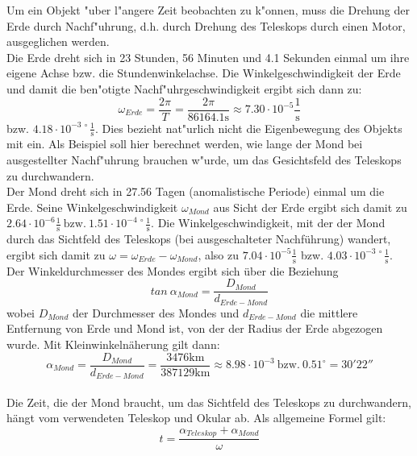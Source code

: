 Um ein Objekt "uber l"angere Zeit beobachten zu k"onnen, muss die Drehung der Erde durch Nachf"uhrung, d.h. durch Drehung des Teleskops durch einen Motor, ausgeglichen werden.
\\
Die Erde dreht sich in 23 Stunden, 56 Minuten und 4.1 Sekunden einmal um ihre eigene Achse bzw. die Stundenwinkelachse.
Die Winkelgeschwindigkeit der Erde und damit die ben"otigte Nachf"uhrgeschwindigkeit ergibt sich dann zu:
\begin{equation}
\omega_{Erde} = \frac{2\pi}{T} = \frac{2\pi}{86164.1 \mathrm{s}} \approx 7.30 \cdot 10^{-5} \frac{1}{\mathrm{s}}
\end{equation}
bzw. $4.18 \cdot 10^{-3\   \circ} \frac{1}{\mathrm{s}}$.
Dies bezieht nat"urlich nicht die Eigenbewegung des Objekts mit ein. Als Beispiel soll hier berechnet werden, wie lange der Mond bei ausgestellter Nachf"uhrung brauchen w"urde, um das Gesichtsfeld des Teleskops zu durchwandern.
\\
Der Mond dreht sich in 27.56 Tagen (anomalistische Periode) einmal um die Erde. Seine Winkelgeschwindigkeit $\omega_{Mond}$ aus Sicht der Erde ergibt sich damit zu $2.64\cdot 10^{-6} \frac{1}{\mathrm{s}}\ \textrm{bzw.}\ 1.51 \cdot 10^{-4\   \circ} \frac{1}{\mathrm{s}}$.
Die Winkelgeschwindigkeit, mit der der Mond durch das Sichtfeld des Teleskops (bei ausgeschalteter Nachführung) wandert, ergibt sich damit zu $\omega = \omega_{Erde}-\omega_{Mond}$, also zu $7.04\cdot 10^{-5} \frac{1}{\mathrm{s}}$ bzw. $4.03 \cdot 10^{-3\   \circ} \frac{1}{\mathrm{s}}$. 
Der Winkeldurchmesser des Mondes ergibt sich über die Beziehung
\begin{equation}
tan\  \alpha_{Mond} = \frac{D_{Mond}}{d_{Erde-Mond}}
\end{equation}
wobei $D_{Mond}$ der Durchmesser des Mondes und $d_{Erde-Mond}$ die mittlere Entfernung von Erde und Mond ist, von der der Radius der Erde abgezogen wurde.
Mit Kleinwinkelnäherung gilt dann:
\begin{equation}
\alpha_{Mond} = \frac{D_{Mond}}{d_{Erde-Mond}} = \frac{3476 \mathrm{km}}{387129 \mathrm{km}} \approx 8.98 \cdot 10^{-3}\ \mathrm{bzw.}\ 0.51^{\circ} = 30' 22''
\end{equation}
\\
Die Zeit, die der Mond braucht, um das Sichtfeld des Teleskops zu durchwandern, hängt vom verwendeten Teleskop und Okular ab.
Als allgemeine Formel gilt:
\begin{equation}
t = \frac{\alpha_{Teleskop}+\alpha_{Mond}}{\omega}
\end{equation}
